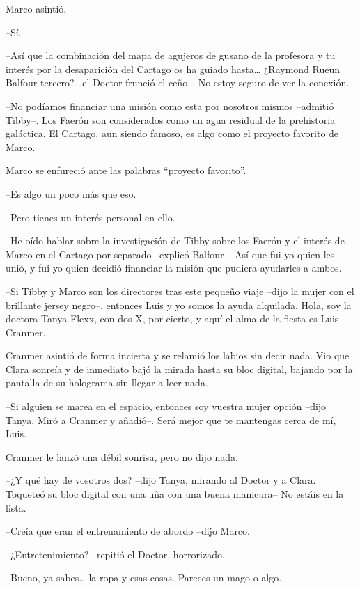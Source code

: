 {Marco asintió.}

{--Sí.}

{--Así que la combinación del mapa de agujeros de gusano de la profesora
 y tu interés por la desaparición del Cartago os ha guiado hasta\ldots{}
 ¿Raymond Rueun Balfour tercero? --el Doctor frunció el ceño--. No estoy
seguro de ver la conexión.}

{--No podíamos financiar una misión como esta por nosotros mismos
 --admitió Tibby--. Los Faerón son considerados como un agua residual de
 la prehistoria galáctica. El Cartago, aun siendo famoso, es algo como el
proyecto favorito de Marco.}

{Marco se enfureció ante las palabras ``proyecto favorito''.}

{--Es algo un poco más que eso.}

{--Pero tienes un interés personal en ello.}

{--He oído hablar sobre la investigación de Tibby sobre los Faerón y el
 interés de Marco en el Cartago por separado --explicó Balfour--. Así que
 fui yo quien les unió, y fui yo quien decidió financiar la misión que
pudiera ayudarles a ambos.}

{--Si Tibby y Marco son los directores tras este pequeño viaje --dijo la
 mujer con el brillante jersey negro--, entonces Luis y yo somos la ayuda
 alquilada. Hola, soy la doctora Tanya Flexx, con dos X, por cierto, y
aquí el alma de la fiesta es Luis Cranmer.}

{Cranmer asintió de forma incierta y se relamió los labios sin decir
 nada. Vio que Clara sonreía y de inmediato bajó la mirada hasta su bloc
 digital, bajando por la pantalla de su holograma sin llegar a leer
nada.}

{--Si alguien se marea en el espacio, entonces soy vuestra mujer opción
 --dijo Tanya. Miró a Cranmer y añadió--. Será mejor que te mantengas
cerca de mí, Luis.}

{Cranmer le lanzó una débil sonrisa, pero no dijo nada.}

{--¿Y qué hay de vosotros dos? --dijo Tanya, mirando al Doctor y a Clara.
 Toqueteó su bloc digital con una uña con una buena manicura-- No estáis
en la lista.}

{--Creía que eran el entrenamiento de abordo --dijo Marco.}

{--¿Entretenimiento? --repitió el Doctor, horrorizado.}

{--Bueno, ya sabes\ldots{} la ropa y esas cosas. Pareces un mago o
algo.}

